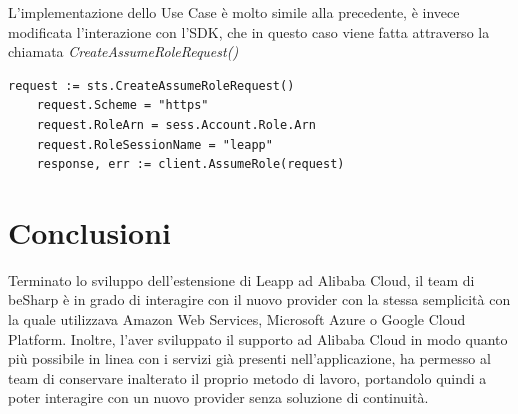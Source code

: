 \documentclass[a4paper]{article}
\begin{document}
L'implementazione dello Use Case è molto simile alla precedente, è invece modificata l'interazione con l'SDK, che in questo caso viene fatta attraverso la chiamata \textit{CreateAssumeRoleRequest()}
\begin{lstlisting}[style=customgo, caption=alibaba\_ram\_role\_chained\_session\_actions.go (righe 208-212), captionpos=b, firstnumber=208]
request := sts.CreateAssumeRoleRequest()
	request.Scheme = "https"
	request.RoleArn = sess.Account.Role.Arn
	request.RoleSessionName = "leapp"
	response, err := client.AssumeRole(request)
\end{lstlisting}

\newpage

\section{Conclusioni}
Terminato lo sviluppo dell'estensione di Leapp ad Alibaba Cloud, il team di beSharp è in grado di interagire con il nuovo provider con la stessa semplicità con la quale utilizzava Amazon Web Services, Microsoft Azure o Google Cloud Platform. Inoltre, l'aver sviluppato il supporto ad Alibaba Cloud in modo quanto più possibile in linea con i servizi già presenti nell'applicazione, ha permesso al team di conservare inalterato il proprio metodo di lavoro, portandolo quindi a poter interagire con un nuovo provider senza soluzione di continuità.
\newpage
\printbibliography
\end{document}
